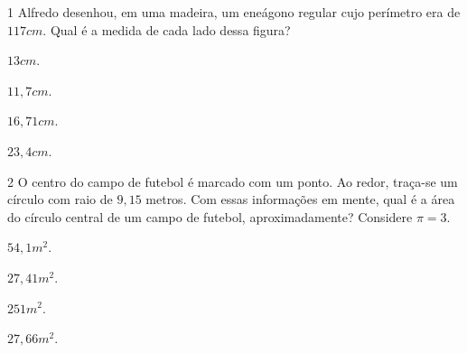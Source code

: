 \num{1} Alfredo desenhou, em uma madeira, um eneágono regular cujo perímetro
era de $117 cm$. Qual é a medida de cada lado dessa figura?


\begin{escolha}[itemsep=0pt]
\item $13 cm$.
\item $11,7 cm$.
\item $16,71 cm$.
\item $23,4 cm$.
\end{escolha}







\num{2} O centro do campo de futebol é marcado com um ponto. Ao redor,
traça-se um círculo com raio de $9,15$ metros. Com essas informações em
mente, qual é a área do círculo central de um campo de futebol,
aproximadamente? Considere $\pi = 3$.

\begin{escolha}[itemsep=0pt]
\item $54,1 m^2$.
\item $27,41 m^2$.
\item $251 m^2$.
\item $27,66 m^2$.
\end{escolha}



